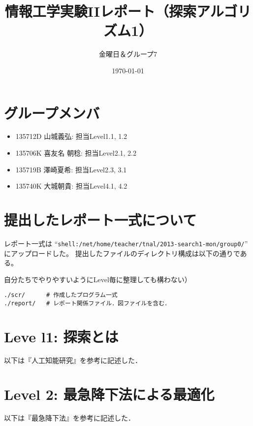 \documentclass[10pt]{jarticle}
\begin{document}
\title{情報工学実験IIレポート（探索アルゴリズム1）}
\author{金曜日＆グループ7} %
\date{\today}

\maketitle
\section*{グループメンバ}
\begin{itemize}
 \item 135712D 山城義弘: 担当Level1.1, 1.2
 \item 135706K 喜友名 朝稔: 担当Level2.1, 2.2
 \item 135719B 澤崎夏希: 担当Level2.3, 3.1
 \item 135740K 大城朝貴: 担当Level4.1, 4.2
\end{itemize}

\section*{提出したレポート一式について}
レポート一式は
``\verb|shell:/net/home/teacher/tnal/2013-search1-mon/group0/|''
にアップロードした。
提出したファイルのディレクトリ構成は以下の通りである。

\vspace{+0.5cm}
自分たちでやりやすいようにLevel毎に整理しても構わない）
\begin{breakbox}
\begin{verbatim}
./scr/      # 作成したプログラム一式
./report/   # レポート関係ファイル．図ファイルを含む．
\end{verbatim}
\end{breakbox}

\newpage
\section{Leve l1: 探索とは}
以下は『人工知能研究\cite{level1}』を参考に記述した．



\newpage

\section{Level 2: 最急降下法による最適化}
以下は『最急降下法\cite{level2}』を参考に記述した．



\end{document}

